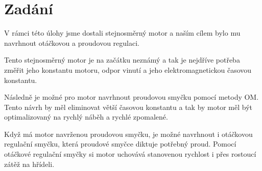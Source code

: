 \renewcommand{\contentsname}{Zadání}
\tableofcontents

\section{Zadání}
V rámci této úlohy jsme dostali stejnosměrný motor a naším cílem bylo mu navrhnout otáčkovou a proudovou regulaci.

Tento stejnosměrný motor je na začátku neznámý a tak je nejdříve potřeba změřit jeho konstantu motoru, odpor vinutí a jeho elektromagnetickou časovou konstantu.

Následně je možné pro motor navrhnout proudovou smyčku pomocí metody OM. Tento návrh by měl eliminovat větší časovou konstantu a tak by motor měl být optimalizovaný na rychlý náběh a rychlé zpomalené.

Když má motor navrženou proudovou smyčku, je možné navrhnout i otáčkovou regulační smyčku, která proudové smyčce diktuje potřebný proud. Pomocí otáčkové regulační smyčky si motor uchovává stanovenou rychlost i přes rostoucí zátěž na hřídeli.